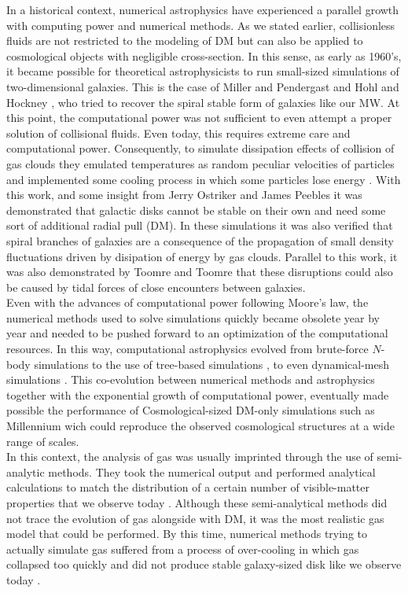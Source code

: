 In a historical context, numerical astrophysics have experienced a parallel growth with computing power and numerical methods. As we stated earlier, collisionless fluids are not restricted to the modeling of DM but can also be applied to cosmological objects with negligible cross-section. In this sense, as early as 1960's, it became possible for theoretical astrophysicists to run small-sized simulations of two-dimensional galaxies. This is the case of Miller and Pendergast \cite{Miller_and_Prendergast_1968} and Hohl and Hockney  \cite{Hohl_and_Hockney_1969}, who tried to recover the spiral stable form of galaxies like our MW. At this point, the computational power was not sufficient to even attempt a proper solution of collisional fluids. Even today, this requires extreme care and computational power. Consequently, to simulate dissipation effects of collision of gas clouds they emulated temperatures as random peculiar velocities of particles and implemented some cooling process in which some particles lose energy \cite{Miller_et_al._1970}. With this work, and some insight from Jerry Ostriker and James Peebles \cite{Ostriker_and_Peebles_1973} it was demonstrated that galactic disks cannot be stable on their own and need some sort of additional radial pull (DM). In these simulations it was also verified that spiral branches of galaxies are a consequence of the propagation of small density fluctuations driven by disipation of energy by gas clouds. Parallel to this work, it was also demonstrated by Toomre and Toomre \cite{Toomre_and_Toomre_1972} that these disruptions could also be caused by tidal forces of close encounters between galaxies.\\


Even with the advances of computational power following Moore's law, the numerical methods used to solve simulations quickly became obsolete year by year and needed to be pushed forward to an optimization of the computational resources. In this way, computational astrophysics evolved from brute-force $N$-body simulations to the use of tree-based simulations \cite{Barnes_and_Hut_1986}, to even dynamical-mesh simulations \cite{Berger_and_Colella_1989}. This co-evolution between numerical methods and astrophysics together with the exponential growth of computational power, eventually made possible the performance of Cosmological-sized DM-only simulations such as Millennium wich could reproduce the observed cosmological structures at a wide range of scales. \\ 

In this context, the analysis of gas was usually imprinted through the use of semi-analytic methods. They took the numerical output and performed analytical calculations to match the distribution of a certain number of visible-matter properties that we observe today \cite{Lemson_et_al._2006,De_Lucia_et_al._2006}. Although these semi-analytical methods did not trace the evolution of gas alongside with DM, it was the most realistic gas model that could be performed. By this time, numerical methods trying to actually simulate gas suffered from a process of over-cooling in which gas collapsed too quickly and did not produce stable galaxy-sized disk like we observe today \cite{Katz_and_Gunn_1991}.\\

